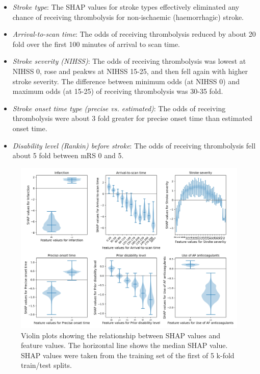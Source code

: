 \begin{itemize}
    \item \emph{Stroke type}: The SHAP values for stroke types effectively eliminated any chance of receiving thrombolysis for non-ischaemic (haemorrhagic) stroke.
    \item \emph{Arrival-to-scan time}: The odds of receiving thrombolysis reduced by about 20 fold over the first 100 minutes of arrival to scan time.
    \item \emph{Stroke severity (NIHSS)}: The odds of receiving thrombolysis was lowest at NIHSS 0, rose and peakws at NIHSS 15-25, and then fell again with higher stroke severity. The difference between minimum odds (at NIHSS 0) and maximum odds (at 15-25) of receiving thrombolysis was 30-35 fold.
    \item \emph{Stroke onset time type (precise vs. estimated)}: The odds of receiving thrombolysis were about 3 fold greater for precise onset time than estimated onset time.
    \item \emph{Disability level (Rankin) before stroke}: The odds of receiving thrombolysis fell about 5 fold between mRS 0 and 5.
\end{itemize}


\begin{figure}
\centering
\includegraphics[width=1\textwidth]{./images/03_xgb_10_features_thrombolysis_shap_violin}
\caption{Violin plots showing the relationship between SHAP values and feature values. The horizontal line shows the median SHAP value. SHAP values were taken from the training set of the first of 5 k-fold train/test splits.}
\label{fig:results_shap_violin}
\end{figure}

